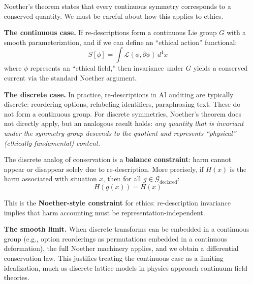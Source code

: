 \documentclass[12pt,letterpaper]{article}
\theoremstyle{definition}
\theoremstyle{remark}
\newcommand{\G}{\mathcal{G}}
\begin{document}
Noether's theorem states that every continuous symmetry corresponds to a conserved quantity. We must be careful about how this applies to ethics.

\textbf{The continuous case.} If re-descriptions form a continuous Lie group $G$ with a smooth parameterization, and if we can define an ``ethical action'' functional:
\begin{equation}
S[\phi] = \int \mathcal{L}(\phi, \partial \phi) \, d^4x
\end{equation}
where $\phi$ represents an ``ethical field,'' then invariance under $G$ yields a conserved current via the standard Noether argument.

\textbf{The discrete case.} In practice, re-descriptions in AI auditing are typically discrete: reordering options, relabeling identifiers, paraphrasing text. These do not form a continuous group. For discrete symmetries, Noether's theorem does not directly apply, but an analogous result holds: \textit{any quantity that is invariant under the symmetry group descends to the quotient and represents ``physical'' (ethically fundamental) content}.

The discrete analog of conservation is a \textbf{balance constraint}: harm cannot appear or disappear solely due to re-description. More precisely, if $H(x)$ is the harm associated with situation $x$, then for all $g \in \G_{\text{declared}}$:
\begin{equation}
H(g(x)) = H(x)
\end{equation}

This is the \textbf{Noether-style constraint} for ethics: re-description invariance implies that harm accounting must be representation-independent.

\textbf{The smooth limit.} When discrete transforms can be embedded in a continuous group (e.g., option reorderings as permutations embedded in a continuous deformation), the full Noether machinery applies, and we obtain a differential conservation law. This justifies treating the continuous case as a limiting idealization, much as discrete lattice models in physics approach continuum field theories.
\end{document}
